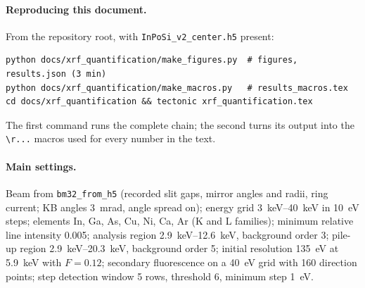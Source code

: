 \documentclass[11pt,a4paper]{article}
\newcommand{\code}[1]{\texttt{#1}}
\begin{document}
\paragraph{Reproducing this document.} From the repository root, with \code{InPoSi\_v2\_center.h5} present:
\begin{verbatim}
python docs/xrf_quantification/make_figures.py  # figures, results.json (3 min)
python docs/xrf_quantification/make_macros.py   # results_macros.tex
cd docs/xrf_quantification && tectonic xrf_quantification.tex
\end{verbatim}
The first command runs the complete chain; the second turns its output into the \verb|\r...| macros used
for every number in the text.

\paragraph{Main settings.} Beam from \code{bm32\_from\_h5} (recorded slit gaps, mirror angles and radii,
ring current; KB angles \qty{3}{mrad}, angle spread on); energy grid \qtyrange{3}{40}{keV} in \qty{10}{eV} steps; elements In, Ga, As, Cu,
Ni, Ca, Ar (K and L families); minimum relative line intensity \num{0.005}; analysis region
\qtyrange{2.9}{12.6}{keV}, background order 3; pile-up region \qtyrange{2.9}{20.3}{keV}, background
order 5; initial resolution \qty{135}{eV} at \qty{5.9}{keV} with $F=0.12$; secondary fluorescence on a
\qty{40}{eV} grid with 160 direction points; step detection window 5 rows, threshold 6, minimum
step \qty{1}{eV}.



\end{document}

